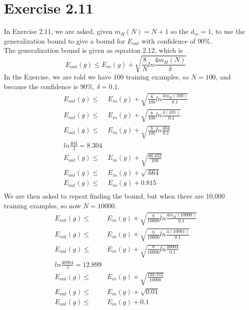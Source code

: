 \documentclass[a4paper]{article}
\begin{document}
\section{Exercise 2.11}
In Exercise 2.11, we are asked, given $m_H(N) = N + 1$ so the $d_{vc} = 1$, to use the generalization bound to give a bound for $E_{out}$ with confidence of $90\%$. \\
The generalization bound is given as equation 2.12, which is 
\begin{equation}
    E_{out}(g) \leq E_{in}(g) + \sqrt{ \frac{8}{N}ln\frac{4m_H(N)}{\delta}}
\end{equation}
In the Exercise, we are told we have 100 training examples, so $N=100$, and because the confidence is $90\%$, $\delta = 0.1$.
\begin{align}
     E_{out}(g) \leq & E_{in}(g) + \sqrt{\frac{8}{100}ln\frac{4m_H(100)}{0.1}}\\
    E_{out}(g) \leq & E_{in}(g) + \sqrt{\frac{8}{100}ln\frac{4(101)}{0.1}}\\
    E_{out}(g) \leq & E_{in}(g) + \sqrt{\frac{8}{100}ln\frac{404}{0.1}}\\
    ln\frac{404}{.1} = 8.304\\
    E_{out}(g) \leq & E_{in}(g) + \sqrt{\frac{66.432}{100}}\\
    E_{out}(g) \leq & E_{in}(g) + \sqrt{.664}\\
    E_{out}(g) \leq & E_{in}(g) + 0.815\\
\end{align}
We are then asked to repeat finding the bound, but when there are 10,000 training examples, so now $N=10000$.
\begin{align}
     E_{out}(g) \leq & E_{in}(g) + \sqrt{\frac{8}{10000}ln\frac{4m_H(10000)}{0.1}}\\
    E_{out}(g) \leq & E_{in}(g) + \sqrt{\frac{8}{10000}ln\frac{4(10001)}{0.1}}\\
    E_{out}(g) \leq & E_{in}(g) + \sqrt{\frac{8}{10000}ln\frac{40004}{0.1}}\\
    ln\frac{40004}{.1} = 12.899\\
    E_{out}(g) \leq & E_{in}(g) + \sqrt{\frac{103.192}{10000}}\\
    E_{out}(g) \leq & E_{in}(g) + \sqrt{0.01}\\
    E_{out}(g) \leq & E_{in}(g) + 0.1\\
\end{align}
\end{document}
